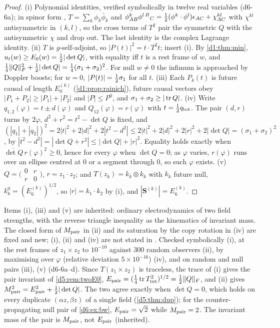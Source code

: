 \begin{proof}
(i) Polynomial identities, verified symbolically in twelve real variables (d6-6a); in spinor form \cite{PenroseRindler84}, $T=\sum_k\phi_k\bar\phi_k$ and
$\phi^k_{AB}\phi^{l\,B}{}_C=\tfrac12(\phi^k\cdot\phi^l)\epsilon_{AC}+\chi^{kl}_{AC}$ with $\chi^{kl}$ antisymmetric in $(k,l)$, so the cross terms of $T^2$
pair the symmetric $Q$ with the antisymmetric $\chi$ and drop out. The last identity is the complex Lagrange identity. (ii) $T$ is
$g$-self-adjoint, so $|P(t)|^2=t\cdot T^2t$; insert (i). By \cref{d1:thm:min}, $u_t(w)\ge E_0(w)=\tfrac12|\det Q|$, with equality iff $t$ is a
rest frame of $w$, and $\tfrac14\|Q\|_F^2+\tfrac12|\det Q|=\tfrac14(\sigma_1+\sigma_2)^2$. For null $w\neq0$ the infimum is approached by Doppler boosts;
for $w=0$, $|P(t)|=\tfrac12\sigma_1$ for all $t$. (iii) Each $P_k(t)$ is future causal of length $E_0^{(k)}$ (\cref{d1:prop:rainich}), future causal
vectors obey $|P_1+P_2|\ge|P_1|+|P_2|$ and $|P|\le P^0$, and $\sigma_1+\sigma_2\ge|\operatorname{tr} Q|$. (iv) Write $q_{1,2}(\varphi)=t\pm d(\varphi)$ and
$Q_{12}(\varphi)=r(\varphi)$ with $t=\tfrac12 q_{\rm tot}$. The pair $(d,r)$ turns by $2\varphi$, $d^2+r^2=t^2-\det Q$ is fixed, and
$(|q_1|+|q_2|)^2=2|t|^2+2|d|^2+2|t^2-d^2|\le2|t|^2+2|d|^2+2|r|^2+2|\det Q|=(\sigma_1+\sigma_2)^2$, by $|t^2-d^2|=|\det Q+r^2|\le|\det Q|+|r|^2$.
Equality holds exactly when $\overline{\det Q}\,r(\varphi)^2\ge0$, hence for every $\varphi$ when $\det Q=0$; as $\varphi$ varies, $r(\varphi)$ runs over an ellipse centred at $0$ or a
segment through $0$, so such $\varphi$ exists. (v) $Q=\bigl(\begin{smallmatrix}0&r\\r&0\end{smallmatrix}\bigr)$, $r=z_1\cdot z_2$; and
$T(z_k)=k_k\otimes k_k$ with $k_k$ future null, $k_k^0=(E_6^{(k)})^{1/2}$, so $|r|=k_1\cdot k_2$ by (i), and $|\mathbf S^{(k)}|=E_6^{(k)}$.
\end{proof}

Items (i), (iii) and (v) are inherited: ordinary electrodynamics of two field strengths, with the reverse triangle inequality as the kinematics
of invariant mass. The closed form of $M_{\rm pair}$ in (ii) and its saturation by the copy rotation in (iv) are fixed and new; (i), (ii) and
(iv) are not stated in \cite{ES17}. Checked symbolically (i), at the rest frames of $z_1\times z_2$ to $10^{-10}$ against $300$ random
observers (ii), by maximising over $\varphi$ (relative deviation $5\times10^{-16}$) (iv), and on random and null pairs (iii), (v) (d6-6a--d).
Since $T(z_1\times z_2)$ is traceless, the trace of (i) gives the pair invariant of \cref{d5:rem:twoE0},
$E_{\rm pair}=(\tfrac14\operatorname{tr} T_{\rm tot}^2)^{1/2}=\tfrac12\|Q\|_F$, and (ii) gives $M_{\rm pair}^2=E_{\rm pair}^2+\tfrac12|\det Q|$. The two agree exactly when
$\det Q=0$, which holds on every duplicate $(\alpha z,\beta z)$ of a single field (\cref{d5:thm:dup}); for the counter-propagating null pair of
\cref{d6:ex:bw}, $E_{\rm pair}=\sqrt2$ while $M_{\rm pair}=2$. The invariant mass of the pair is $M_{\rm pair}$, not $E_{\rm pair}$ (inherited).

